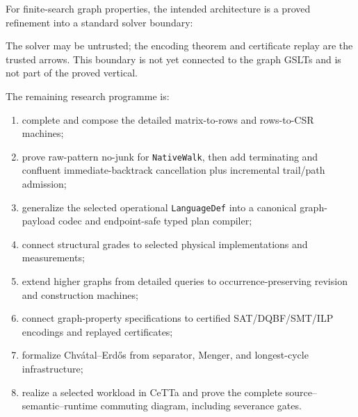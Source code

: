 \documentclass[11pt]{article}
\theoremstyle{remark}
\newcommand{\code}[1]{\texttt{#1}}
\begin{document}
For finite-search graph properties, the intended architecture is a proved
refinement into a standard solver boundary:
\begin{center}
\end{center}
The solver may be untrusted; the encoding theorem and certificate replay are
the trusted arrows.  This boundary is not yet connected to the graph GSLTs and
is not part of the proved vertical.

The remaining research programme is:
\begin{enumerate}[label=\arabic*.,leftmargin=2.2em]
  \item complete and compose the detailed matrix-to-rows and rows-to-CSR
        machines;
  \item prove raw-pattern no-junk for \code{NativeWalk}, then add terminating
        and confluent immediate-backtrack cancellation plus incremental
        trail/path admission;
  \item generalize the selected operational \code{LanguageDef} into a
        canonical graph-payload codec and endpoint-safe typed plan compiler;
  \item connect structural grades to selected physical implementations and
        measurements;
  \item extend higher graphs from detailed queries to occurrence-preserving
        revision and construction machines;
  \item connect graph-property specifications to certified
        SAT/DQBF/SMT/ILP encodings and replayed certificates;
  \item formalize Chv\'atal--Erd\H{o}s from separator, Menger, and
        longest-cycle infrastructure;
  \item realize a selected workload in CeTTa and prove the complete
        source--semantic--runtime commuting diagram, including severance
        gates.
\end{enumerate}
\end{document}
